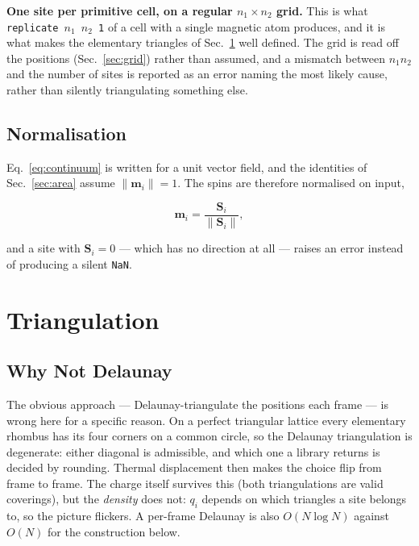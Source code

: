 \documentclass[12pt, a4paper, oneside]{article}
\newcommand{\mvec}{\mathbf{m}}
\newcommand{\Na}{N}
\begin{document}
\textbf{One site per primitive cell, on a regular $n_1\times n_2$ grid.} This
is what \texttt{replicate $n_1$ $n_2$ 1} of a cell with a single magnetic atom
produces, and it is what makes the elementary triangles of Sec.~\ref{sec:tri}
well defined. The grid is read off the positions (Sec.~\ref{sec:grid}) rather
than assumed, and a
mismatch between $n_1n_2$ and the number of sites is reported as an error
naming the most likely cause, rather than silently triangulating something
else.

\subsection{Normalisation}

Eq.~\eqref{eq:continuum} is written for a unit vector field, and the identities
of Sec.~\ref{sec:area} assume $\lVert\mvec_i\rVert=1$. The spins are therefore
normalised on input,

\begin{equation}
    \mvec_i = \frac{\mathbf{S}_i}{\lVert\mathbf{S}_i\rVert} ,
\end{equation}

and a site with $\mathbf{S}_i=0$ --- which has no direction at all --- raises an
error instead of producing a silent \texttt{NaN}.

\section{Triangulation}
\label{sec:tri}

\subsection{Why Not Delaunay}

The obvious approach --- Delaunay-triangulate the positions each frame --- is
wrong here for a specific reason. On a perfect triangular lattice every
elementary rhombus has its four corners on a common circle, so the Delaunay
triangulation is degenerate: either diagonal is admissible, and which one a
library returns is decided by rounding. Thermal displacement then makes the
choice flip from frame to frame. The charge itself survives this (both
triangulations are valid coverings), but the \emph{density} does not: $q_i$
depends on which triangles a site belongs to, so the picture flickers. A
per-frame Delaunay is also $O(\Na\log\Na)$ against $O(\Na)$ for the
construction below.
\end{document}
